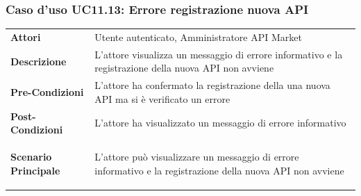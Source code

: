 \subsubsection{Caso d'uso UC11.13: Errore registrazione nuova API}
\label{UC11_13}

\begin{minipage}{\linewidth}
	\begin{tabular}{ l | p{11cm}}
		\hline
		\rowcolor{Gray}
		\multicolumn{2}{c}{UC11.13 - Errore registrazione nuova API} \\
		\hline
		\textbf{Attori} & Utente autenticato, Amministratore API Market \\
		\textbf{Descrizione} & L'attore visualizza un messaggio di errore informativo e la registrazione della nuova API non avviene \\
		\textbf{Pre-Condizioni} & L'attore ha confermato la registrazione della una nuova API ma si è verificato un errore \\
		\textbf{Post-Condizioni} & L'attore ha visualizzato un messaggio di errore informativo \\
		\textbf{Scenario Principale} & 
		\begin{enumerate*}[label=(\arabic*.),itemjoin={\newline}]
			\item L'attore può visualizzare un messaggio di errore informativo e la registrazione della nuova API non avviene
		\end{enumerate*}\\
	\end{tabular}
\end{minipage}